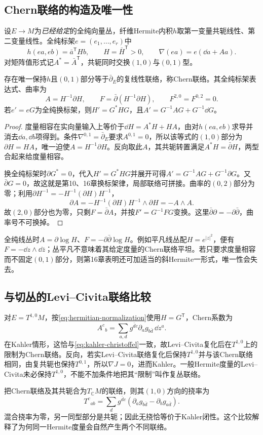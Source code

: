 \subsection{Chern联络的构造及唯一性}
设$E\to M$为\emph{已经给定}的全纯向量丛，纤维Hermite内积$h$取第一变量共轭线性、第二变量线性。全纯标架$e=(e_1,\ldots,e_r)$中
\[
 h(ea,eb)=\bar a^{\mathsf T}Hb,\qquad H=\bar H^{\mathsf T}>0,
 \qquad\nabla(ea)=e(\dd a+Aa).
\]
对矩阵值形式记$A^*=\bar A^{\mathsf T}$，共轭同时交换$(1,0)$与$(0,1)$型。

\begin{theorem}\label{thm:chern-connection}
存在唯一保持$h$且$(0,1)$部分等于$\bar\partial_E$的复线性联络，称Chern联络。其全纯标架表达式、曲率为
\begin{equation}\label{eq:chern-matrix}
 A=H^{-1}\partial H,\qquad
 F=\bar\partial(H^{-1}\partial H),\qquad F^{2,0}=F^{0,2}=0.
\end{equation}
若$e'=eG$为全纯换标架，则$H'=G^*HG$，且$A'=G^{-1}AG+G^{-1}\dd G$。
\end{theorem}
\begin{proof}
度量相容在实向量输入上等价于$\dd H=A^*H+HA$，由对$h(ea,eb)$求导并消去$\dd a,\dd b$项得到。条件$\nabla^{0,1}=\bar\partial_E$要求$A^{0,1}=0$，所以该等式的$(1,0)$部分为$\partial H=HA$，唯一迫使$A=H^{-1}\partial H$。反向取此$A$，其共轭转置满足$A^*H=\bar\partial H$，两型合起来给度量相容。

换全纯标架时$\partial G^*=0$，代入$H'=G^*HG$并展开可得$A'=G^{-1}AG+G^{-1}\partial G$。又$\bar\partial G=0$，故这就是第10、16章换标架律，局部联络可拼接。曲率的$(0,2)$部分为零；利用$\partial H^{-1}=-H^{-1}(\partial H)H^{-1}$，
\[
 \partial A=-H^{-1}(\partial H)H^{-1}\wedge\partial H=-A\wedge A.
\]
故$(2,0)$部分也为零，只剩$F=\bar\partial A$，并按$F'=G^{-1}FG$变换。这里$\bar\partial\partial=-\partial\bar\partial$，曲率号不可换掉。
\end{proof}
全纯线丛时$A=\partial\log H$、$F=-\partial\bar\partial\log H$。例如平凡线丛配$H=e^{|z|^2}$，便有$F=-\dd z\wedge\dd\bar z$；丛平凡不意味着其给定度量的Chern联络平坦。若只要求度量相容而不固定$(0,1)$部分，则第16章表明还可加适当的斜Hermite一形式，唯一性会失去。

\subsection{与切丛的Levi--Civita联络比较}
对$E=T^{1,0}M$，按\eqref{eq:hermitian-normalization}使用$H=G^{\mathsf T}$，Chern系数为
\[
 A^c{}_b=\sum_{a,d}g^{\bar d c}\partial_a g_{b\bar d}\,\dd z^a.
\]
在Kahler情形，这恰与\eqref{eq:kahler-christoffel}一致，故Levi--Civita复化后在$T^{1,0}$上的限制为Chern联络。反向，若实Levi--Civita联络复化后保持$T^{1,0}$并与该Chern联络相同，由复共轭也保持$T^{0,1}$，所以$\nabla J=0$，进而Kahler。一般Hermite度量的Levi--Civita未必保持$T^{1,0}$，不能不加条件地把其“限制”叫作复丛联络。

把Chern联络及其共轭合为$T_{\mathbb C}M$的联络，则其$(1,0)$方向的挠率为
\[
 T^c{}_{ab}=\sum_dg^{\bar d c}
 (\partial_ag_{b\bar d}-\partial_bg_{a\bar d}).
\]
混合挠率为零，另一同型部分是共轭；因此无挠恰等价于Kahler闭性。这个比较解释了为何同一Hermite度量会自然产生两个不同联络。
